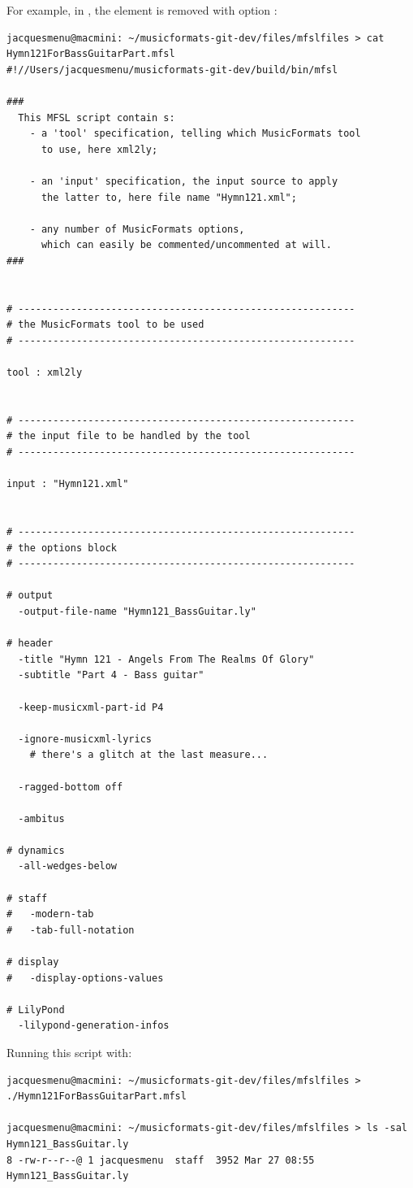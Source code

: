 For example, in , the  element is removed with option :
\begin{lstlisting}[language=Terminal]
jacquesmenu@macmini: ~/musicformats-git-dev/files/mfslfiles > cat Hymn121ForBassGuitarPart.mfsl
#!//Users/jacquesmenu/musicformats-git-dev/build/bin/mfsl

###
  This MFSL script contain s:
    - a 'tool' specification, telling which MusicFormats tool
      to use, here xml2ly;

    - an 'input' specification, the input source to apply
      the latter to, here file name "Hymn121.xml";

    - any number of MusicFormats options,
      which can easily be commented/uncommented at will.
###


# ----------------------------------------------------------
# the MusicFormats tool to be used
# ----------------------------------------------------------

tool : xml2ly


# ----------------------------------------------------------
# the input file to be handled by the tool
# ----------------------------------------------------------

input : "Hymn121.xml"


# ----------------------------------------------------------
# the options block
# ----------------------------------------------------------

# output
  -output-file-name "Hymn121_BassGuitar.ly"

# header
  -title "Hymn 121 - Angels From The Realms Of Glory"
  -subtitle "Part 4 - Bass guitar"

  -keep-musicxml-part-id P4

  -ignore-musicxml-lyrics
    # there's a glitch at the last measure...

  -ragged-bottom off

  -ambitus

# dynamics
  -all-wedges-below

# staff
#   -modern-tab
#   -tab-full-notation

# display
#   -display-options-values

# LilyPond
  -lilypond-generation-infos
\end{lstlisting}

Running this script with:
\begin{lstlisting}[language=Terminal]
jacquesmenu@macmini: ~/musicformats-git-dev/files/mfslfiles > ./Hymn121ForBassGuitarPart.mfsl

jacquesmenu@macmini: ~/musicformats-git-dev/files/mfslfiles > ls -sal Hymn121_BassGuitar.ly
8 -rw-r--r--@ 1 jacquesmenu  staff  3952 Mar 27 08:55 Hymn121_BassGuitar.ly
\end{lstlisting}

